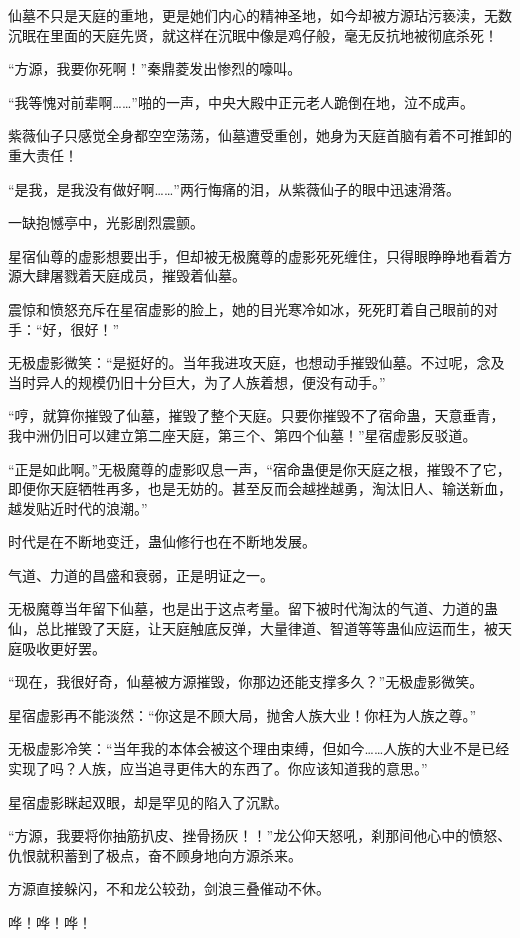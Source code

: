 \begin{this_body}
仙墓不只是天庭的重地，更是她们内心的精神圣地，如今却被方源玷污亵渎，无数沉眠在里面的天庭先贤，就这样在沉眠中像是鸡仔般，毫无反抗地被彻底杀死！

“方源，我要你死啊！”秦鼎菱发出惨烈的嚎叫。

“我等愧对前辈啊……”啪的一声，中央大殿中正元老人跪倒在地，泣不成声。

紫薇仙子只感觉全身都空空荡荡，仙墓遭受重创，她身为天庭首脑有着不可推卸的重大责任！

“是我，是我没有做好啊……”两行悔痛的泪，从紫薇仙子的眼中迅速滑落。

一缺抱憾亭中，光影剧烈震颤。

星宿仙尊的虚影想要出手，但却被无极魔尊的虚影死死缠住，只得眼睁睁地看着方源大肆屠戮着天庭成员，摧毁着仙墓。

震惊和愤怒充斥在星宿虚影的脸上，她的目光寒冷如冰，死死盯着自己眼前的对手：“好，很好！”

无极虚影微笑：“是挺好的。当年我进攻天庭，也想动手摧毁仙墓。不过呢，念及当时异人的规模仍旧十分巨大，为了人族着想，便没有动手。”

“哼，就算你摧毁了仙墓，摧毁了整个天庭。只要你摧毁不了宿命蛊，天意垂青，我中洲仍旧可以建立第二座天庭，第三个、第四个仙墓！”星宿虚影反驳道。

“正是如此啊。”无极魔尊的虚影叹息一声，“宿命蛊便是你天庭之根，摧毁不了它，即便你天庭牺牲再多，也是无妨的。甚至反而会越挫越勇，淘汰旧人、输送新血，越发贴近时代的浪潮。”

时代是在不断地变迁，蛊仙修行也在不断地发展。

气道、力道的昌盛和衰弱，正是明证之一。

无极魔尊当年留下仙墓，也是出于这点考量。留下被时代淘汰的气道、力道的蛊仙，总比摧毁了天庭，让天庭触底反弹，大量律道、智道等等蛊仙应运而生，被天庭吸收更好罢。

“现在，我很好奇，仙墓被方源摧毁，你那边还能支撑多久？”无极虚影微笑。

星宿虚影再不能淡然：“你这是不顾大局，抛舍人族大业！你枉为人族之尊。”

无极虚影冷笑：“当年我的本体会被这个理由束缚，但如今……人族的大业不是已经实现了吗？人族，应当追寻更伟大的东西了。你应该知道我的意思。”

星宿虚影眯起双眼，却是罕见的陷入了沉默。

“方源，我要将你抽筋扒皮、挫骨扬灰！！”龙公仰天怒吼，刹那间他心中的愤怒、仇恨就积蓄到了极点，奋不顾身地向方源杀来。

方源直接躲闪，不和龙公较劲，剑浪三叠催动不休。

哗！哗！哗！


\end{this_body}
